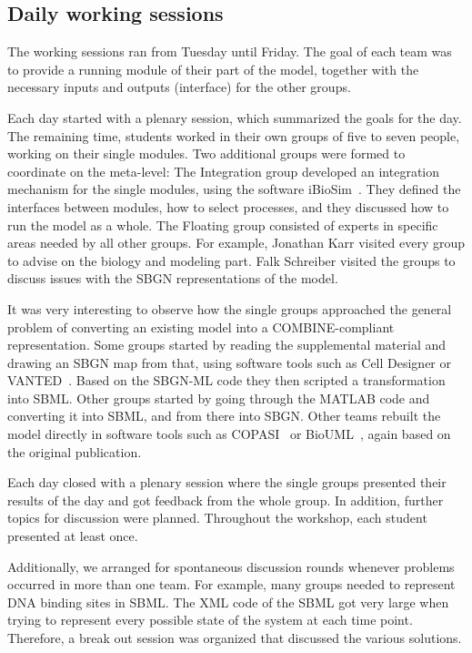 \documentclass[journal,transmag]{IEEEtran}
\begin{document}
\subsection{Daily working sessions}
The working sessions ran from Tuesday until Friday. 
The goal of each team was to provide a running module of their part of the model, together with the necessary inputs and outputs (interface) for the other groups. 

Each day started with a plenary session, which summarized the goals for the day. 
The remaining time, students worked in their own groups of five to seven people, working on their single modules. 
Two additional groups were formed to coordinate on the meta-level: 
The Integration group developed an integration mechanism for the single modules, using the software iBioSim~\cite{Stevens2013}. 
They defined the interfaces between modules, how to select processes, and they discussed how to run the model as a whole.
The Floating group consisted of experts in specific areas needed by all other groups.
For example, Jonathan Karr visited every group to advise on the biology and modeling part. 
Falk Schreiber visited the groups to discuss issues with the SBGN representations of the model. 

It was very  interesting to observe how the single groups  approached the general problem of converting an existing model into a COMBINE-compliant representation. 
Some groups started by reading the supplemental material and drawing an SBGN map from that, using software tools such as  Cell Designer \cite{funahashi2008celldesigner} or VANTED~\cite{Rohn2012}. 
Based on the SBGN-ML code they then scripted a transformation into SBML. 
Other groups started by going through the MATLAB code and converting it into SBML, and from there into SBGN. 
Other teams rebuilt the model directly in software tools such as  COPASI~\cite{Mendes2009} or BioUML~\cite{Kolpakov2006}, again based on the original publication.  

Each day closed with  a plenary session where the single groups presented their results of the day and got feedback from the whole group. In addition, further topics for discussion were planned.
Throughout the workshop, each student presented at least once.  

Additionally, we arranged for spontaneous discussion rounds whenever problems occurred in more than one team. 
For example, many groups needed to represent DNA binding sites in SBML. 
The XML code of the SBML got very large when trying to represent every possible state of the system at each time point. 
Therefore, a break out session was organized that discussed the various solutions. 
\end{document}
